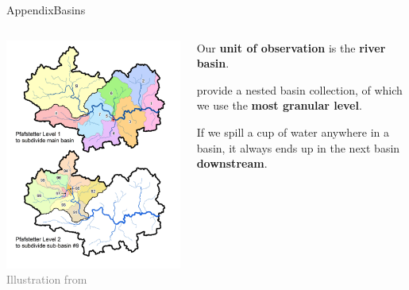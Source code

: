 \documentclass[aspectratio=169,11pt,dvipsnames, handout]{beamer}
\begin{document}


\begin{frame}{\textcolor{defaultclr!30}{Appendix}\hspace{0.75em}Basins}
\label{frame:appbasins}

\begin{columns}
    \begin{column}{0.4\textwidth}
        \centering
        \includegraphics[width=0.85\linewidth]{img/basins_lehnergrill.png}
        \textcolor{gray}{\footnotesize Illustration from \textcite{lehner2013}}
    \end{column}

    \begin{column}{0.55\textwidth}
        Our \textbf{unit of observation} is the \textbf{river basin}.

        \vspace{1em}

        \textcite{lehner2013} provide a nested basin collection, of which we use the \textbf{most granular level}.

        \vspace{1em}

        If we spill a cup of water anywhere in a basin, it always ends up in the next basin \colorbox{downcol!30}{\bfseries downstream}.

        \vspace{1em}\flushright

        \hyperlink{frame:intro}{}
    \end{column}
\end{columns}

\end{frame}
\end{document}
